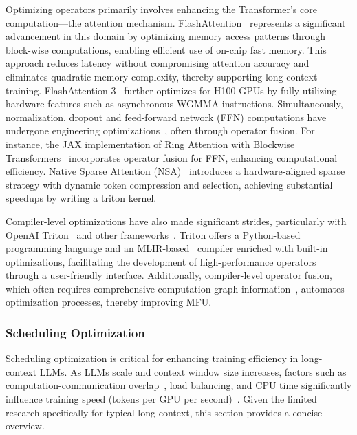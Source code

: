 Optimizing operators primarily involves enhancing the Transformer's core computation—the attention mechanism. FlashAttention~\citep{dao2022flashattention, daoflashattention} represents a significant advancement in this domain by optimizing memory access patterns through block-wise computations, enabling efficient use of on-chip fast memory. This approach reduces latency without compromising attention accuracy and eliminates quadratic memory complexity, thereby supporting long-context training. FlashAttention-3~\citep{shah2024flashattention} further optimizes for H100 GPUs by fully utilizing hardware features such as asynchronous WGMMA instructions. Simultaneously, normalization, dropout and feed-forward network (FFN) computations have undergone engineering optimizations~\citep{liu2023ring, Ma2024ReducingTC, Shoeybi2019MegatronLMTM}, often through operator fusion. For instance, the JAX implementation of Ring Attention with Blockwise Transformers~\citep{liu2023ring} incorporates operator fusion for FFN, enhancing computational efficiency. Native Sparse Attention (NSA)~\citep{minimax2025minimax01scalingfoundationmodels} introduces a hardware-aligned sparse strategy with dynamic token compression and selection, achieving substantial speedups by writing a triton kernel.

Compiler-level optimizations have also made significant strides, particularly with OpenAI Triton~\citep{tillet2019triton} and other frameworks~\citep{dong2024flex, Spector2024ThunderKittensSF}. Triton offers a Python-based programming language and an MLIR-based~\citep{lattner2020mlir} compiler enriched with built-in optimizations, facilitating the development of high-performance operators through a user-friendly interface. Additionally, compiler-level operator fusion, which often requires comprehensive computation graph information~\citep{chen2018tvm, PyTorch2024torch_compiler, wu2024multi}, automates optimization processes, thereby improving MFU.

\subsubsection{Scheduling Optimization}

Scheduling optimization is critical for enhancing training efficiency in long-context LLMs. As LLMs scale and context window size increases, factors such as computation-communication overlap~\citep{wang2024hiding}, load balancing, and CPU time significantly influence training speed (tokens per GPU per second)~\citep{dubey2024llama, Deepseek2024DeepSeek-V3}.  Given the limited research specifically for typical long-context, this section provides a concise overview.

